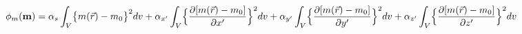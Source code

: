 \vspace{-0.1cm}
\begin{equation}
    \phi_{m}(\mathbf{m}) =\alpha_s \int_V \bigl\{ m(\vec{r}) - m_0 \bigr\}^2 dv \\ + \alpha_{x'} \int_V \Bigl\{ \frac{\partial{[m(\vec{r}) - m_0]}}{\partial{x'}} \Bigr\}^2 dv \\ + \alpha_{y'} \int_V \Bigl\{ \frac{\partial{[m(\vec{r}) - m_0]}}{\partial{y'}} \Bigr\}^2 dv \\ + \alpha_{z'} \int_V \Bigl\{ \frac{\partial{[m(\vec{r}) - m_0]}}{\partial{z'}} \Bigr\}^2 dv
    \label{eq:forward-pass}
    \vspace{-0.05cm}
\end{equation}